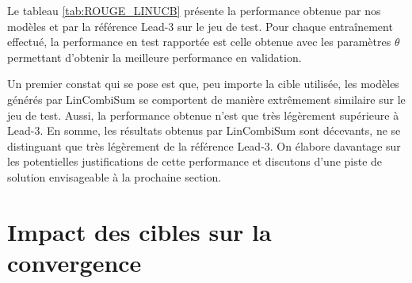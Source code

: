 Le tableau \ref{tab:ROUGE_LINUCB} présente la performance 
obtenue par nos modèles et par la référence Lead-3 sur le jeu de test.
Pour chaque entraînement effectué, la performance en test 
rapportée est celle obtenue avec les paramètres $\theta$
permettant d'obtenir la meilleure performance en validation.

\begin{table}[!h]
    \centering
    \def\arraystretch{1.8}
    \caption[Score ROUGE de LinCombiSum sur le jeu de test selon la cible utilisée]
    {Score ROUGE (plus élevé est meilleur) de LinCombiSum sur le jeu de test selon la cible utilisée}
    \label{tab:ROUGE_LINUCB}
\end{table}

Un premier constat qui se pose est que, peu importe la cible 
utilisée, les modèles générés par LinCombiSum se comportent de manière 
extrêmement similaire sur le jeu de test.
Aussi, la performance obtenue n'est que 
très légèrement supérieure à Lead-3.
En somme, les résultats obtenus par LinCombiSum sont décevants,
ne se distinguant que très légèrement de la référence Lead-3.
On élabore davantage sur les potentielles 
justifications de cette performance et discutons 
d'une piste de solution envisageable à la prochaine section.

\section{Impact des cibles sur la convergence}
\label{sec:analyse_convergence}

